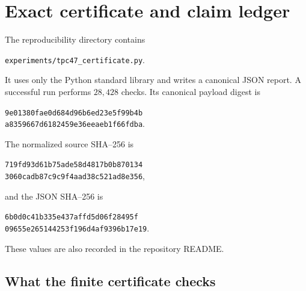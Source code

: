 \section{Exact certificate and claim ledger}
\label{sec:tpc47-certificate}

The reproducibility directory contains
\begin{center}
 \texttt{experiments/tpc47\_certificate.py}.
\end{center}
It uses only the Python standard library and writes a canonical JSON
report.  A successful run performs \(28{,}428\) checks.  Its canonical
payload digest is
\begin{center}
 \texttt{9e01380fae0d684d96b6ed23e5f99b4b}\\
 \texttt{a8359667d6182459e36eeaeb1f66fdba}.
\end{center}
The normalized source SHA--256 is
\begin{center}
 \texttt{719fd93d61b75ade58d4817b0b870134}\\
 \texttt{3060cadb87c9c9f4aad38c521ad8e356},
\end{center}
and the JSON SHA--256 is
\begin{center}
 \texttt{6b0d0c41b335e437affd5d06f28495f}\\
 \texttt{09655e265144253f196d4af9396b17e19}.
\end{center}
These values are also recorded in the repository README.

\subsection{What the finite certificate checks}

